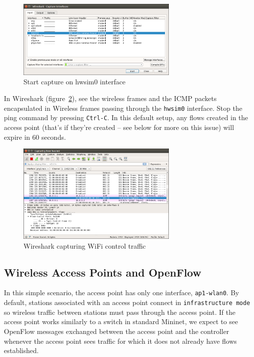 \begin{figure}
    \centering
    \includegraphics[width=0.7\textwidth]{Pictures/mn-wifi-008.png}
    \caption{Start capture on hwsim0 interface}
    \label{fig:capture}
\end{figure}

\noindent In Wireshark (figure~\ref{fig:traffic-wireshark}), see the wireless frames and the ICMP packets encapsulated in Wireless frames passing through the \texttt{hwsim0} interface. Stop the ping command by pressing \texttt{Ctrl-C}. In this default setup, any flows created in the access point (that's if they're created -- see below for more on this issue) will expire in 60 seconds.


\begin{figure}
    \centering
    \includegraphics[width=0.7\textwidth]{Pictures/mn-wifi-010.png}
    \caption{Wireshark capturing WiFi control traffic}
    \label{fig:traffic-wireshark}
\end{figure}

\subsection{Wireless Access Points and OpenFlow}

In this simple scenario, the access point has only one interface, \texttt{ap1-wlan0}. By default, stations associated with an access point connect in \texttt{infrastructure mode} so wireless traffic between stations must pass through the access point. If the access point works similarly to a switch in standard Mininet, we expect to see OpenFlow messages exchanged between the access point and the controller whenever the access point sees traffic for which it does not already have flows established.

